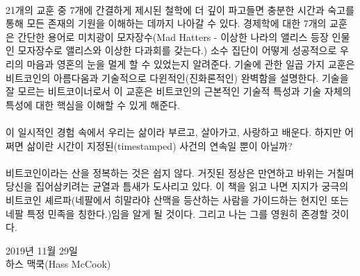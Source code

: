 \paragraph{}
21개의 교훈 중 7개에 간결하게 제시된 철학에 더 깊이 파고들면 충분한 시간과 숙고를 통해 모든 존재의 기원을 이해하는 데까지 나아갈 수 있다. 
경제학에 대한 7개의 교훈은 간단한 용어로 미치광이 모자장수(Mad Hatters - 이상한 나라의 앨리스 등장 인물인 모자장수로 앨리스와 이상한 다과회를 갖는다.) 소수 집단이 어떻게 성공적으로 우리의 마음과 영혼의 눈을 멀게 할 수 있었는지 알려준다. 
기술에 관한 일곱 가지 교훈은 비트코인의 아름다움과 기술적으로 다윈적인(진화론적인) 완벽함을 설명한다. 
기술을 잘 모르는 비트코이너로서 이 교훈은 비트코인의 근본적인 기술적 특성과 기술 자체의 특성에 대한 핵심을 이해할 수 있게 해준다.

\paragraph{}
이 일시적인 경험 속에서 우리는 삶이라 부르고, 살아가고, 사랑하고 배운다. 
하지만 어쩌면 삶이란 시간이 지정된(timestamped) 사건의 연속일 뿐이 아닐까? 

\paragraph{}
비트코인이라는 산을 정복하는 것은 쉽지 않다. 거짓된 정상은 만연하고 바위는 거칠며 당신을 집어삼키려는 균열과 틈새가 도사리고 있다.
이 책을 읽고 나면 지지가 궁극의 비트코인 셰르파(네팔에서 히말라야 산맥을 등산하는 사람을 가이드하는 현지인 또는 네팔 특정 민족을 칭한다.)임을 알게 될 것이다. 
그리고 나는 그를 영원히 존경할 것이다. 

\begin{flushright}
	2019년 11월 29일 \\
	하스 맥쿡(Hass McCook)
\end{flushright}

